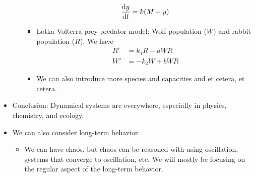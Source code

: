 \documentclass[../notes.tex]{subfiles}
\begin{document}
\begin{itemize}
\begin{itemize}
\begin{itemize}
\begin{equation*}
                \dv{y}{t} = k(M-y)
            \end{equation*}
            \item Lotka-Volterra prey-predator model: Wolf population ($W$) and rabbit population ($R$). We have
            \begin{align*}
                R' &= k_1R-aWR\\
                W' &= -k_2W+bWR
            \end{align*}
            \item We can also introduce more species and capacities and et cetera, et cetera.
        \end{itemize}
    \end{itemize}
    \item Conclusion: Dynamical systems are everywhere, especially in physics, chemistry, and ecology.
    \item We can also consider long-term behavior.
    \begin{itemize}
        \item We can have chaos, but chaos can be reasoned with using oscillation, systems that converge to oscillation, etc. We will mostly be focusing on the regular aspect of the long-term behavior.
    \end{itemize}
\end{itemize}
\end{document}
